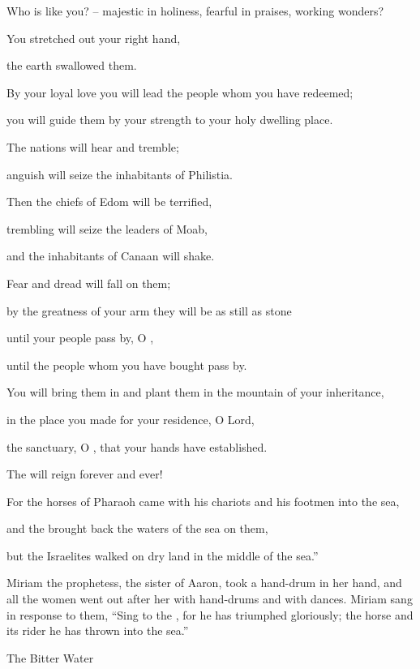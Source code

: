 {\par }{\Q Who
is like you? – majestic in holiness, fearful in praises, working wonders?
\par }{\Q {}You stretched
out your right hand,
\par }{\Q the earth
swallowed them.
\par }{\Q {}By your loyal love
you will lead
the people
whom
you have redeemed;
\par }{\Q you will guide
them by your strength
to
your holy
dwelling place.
\par }{\Q {}The nations
will hear
and tremble;
\par }{\Q anguish
will seize
the inhabitants
of Philistia.
\par }{\Q {}Then
the chiefs
of Edom
will be terrified,
\par }{\Q trembling
will seize
the leaders
of Moab,
\par }{\Q and the inhabitants
of Canaan
will shake.
\par }{\Q {}Fear
and dread
will fall
on
them;
\par }{\Q by the greatness
of your arm
they will be as still
as stone
\par }{\Q until
your people
pass
by, O
{},
\par }{\Q until
the people
whom
you have bought
pass by.
\par }{\Q {}You will bring
them in and plant
them in the mountain
of your inheritance,
\par }{\Q in the place
you made for your residence,
O Lord,
\par }{\Q the sanctuary,
O
{}, that your hands
have established.
\par }{\Q {}The
{}
will reign
forever
and ever!
\par }{\Q {}For
the horses
of Pharaoh
came
with his chariots
and his footmen
into the sea,
\par }{\Q and the
{}
brought back
the waters
of the sea
on
them,
\par }{\Q but the Israelites
walked
on dry land
in the middle
of the sea.”
\par }{\PP {}Miriam
the prophetess,
the sister
of Aaron,
took
a hand-drum
in her hand,
and all
the women
went out
after
her with hand-drums
and with dances.
Miriam
sang in response
to them, “Sing
to the
{}, for
he
has triumphed
gloriously;
the horse
and its rider
he has thrown
into the sea.”
\par }{\SH The Bitter Water
}
